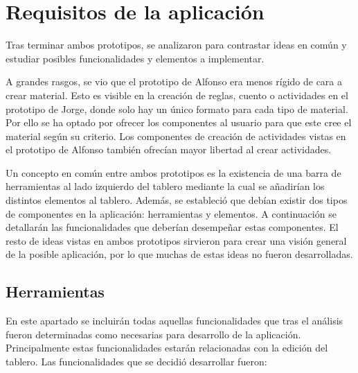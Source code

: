 \section{Requisitos de la aplicación}
\label{cap4:requisitosapp}

Tras terminar ambos prototipos, se analizaron para contrastar ideas en común y estudiar posibles funcionalidades y elementos a implementar.

A grandes rasgos, se vio que el prototipo de Alfonso era menos rígido de cara a crear material. Esto es visible en la creación de reglas, cuento o actividades en el prototipo de Jorge, donde solo hay un único formato para cada tipo de material. Por ello se ha optado por ofrecer los componentes al usuario para que este cree el material según su criterio. Los componentes de creación de actividades vistas en el prototipo de Alfonso también ofrecían mayor libertad al crear actividades. 

Un concepto en común entre ambos prototipos es la existencia de una barra de herramientas al lado izquierdo del tablero mediante la cual se añadirían los distintos elementos al tablero. Además, se estableció que debían existir dos tipos de componentes en la aplicación: herramientas y elementos.
A continuación se detallarán las funcionalidades que deberían desempeñar estas componentes. El resto de ideas vistas en ambos prototipos sirvieron para crear una visión general de la posible aplicación, por lo que muchas de estas ideas no fueron desarrolladas.  

\subsection{Herramientas}

En este apartado se incluirán todas aquellas funcionalidades que tras el análisis fueron determinadas como necesarias para desarrollo de la aplicación. Principalmente estas funcionalidades estarán relacionadas con la edición del tablero. Las funcionalidades que se decidió desarrollar fueron:

